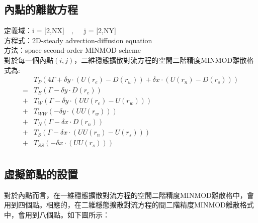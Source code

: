 \documentclass[12pt]{article}
\begin{document}
\subsection{內點的離散方程}
\noindent 定義域：i = [2,NX]$\quad,\quad$ j = [2,NY]\\[1.5ex]
\noindent 方程式：2D-steady advection-diffusion equation\\[1.5ex]
\noindent 方法：space second-order MINMOD scheme\\[1.5ex]
\noindent 對於每一個內點$(i,j)$，二維穩態擴散對流方程的空間二階精度MINMOD離散格式為:\\
\begin{equation}\begin{split}
    &T_{P}(4\Gamma+ \delta y\cdot(U(r_{e})-D(r_{w}))+\delta x\cdot (U(r_{n})-D(r_{s})))\\[1.5ex]
    =&T_{E}(\Gamma-\delta y \cdot D(r_{e}))\\[1.5ex]
    +&T_{W}(\Gamma-\delta y \cdot (UU(r_{e})-U(r_{w})))\\[1.5ex]
    +&T_{WW}(-\delta y\cdot (UU(r_{w})))\\[1.5ex]
    +&T_{N}(\Gamma-\delta x \cdot D(r_{n}))\\[1.5ex]
    +&T_{S}(\Gamma-\delta x \cdot (UU(r_{n})-U(r_{s})))\\[1.5ex]
    +&T_{SS}(-\delta x\cdot (UU(r_{s}))) \\[1.5ex]
\end{split}\end{equation}
\subsection{虛擬節點的設置}
\noindent 對於內點而言，在一維穩態擴散對流方程的空間二階精度MINMOD離散格中，會用到四個點。相應的，在二維穩態擴散對流方程的間二階精度MINMOD離散格式中，會用到八個點。如下圖所示：
\end{document}
